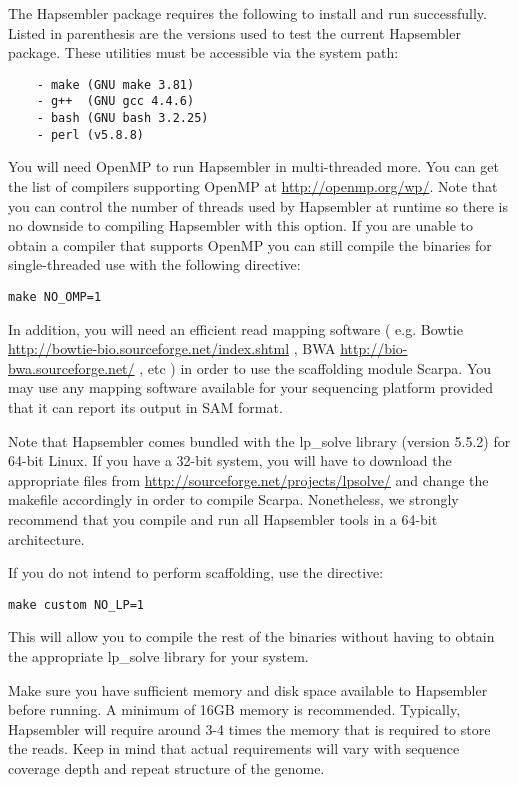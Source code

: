 \documentclass[12pt,a4paper]{report}
\begin{document}
The Hapsembler package requires the following to install and run successfully. Listed in parenthesis are the versions used to test the current Hapsembler package. These utilities must be accessible via the system path:

\begin{verbatim}
    - make (GNU make 3.81)
    - g++  (GNU gcc 4.4.6)
    - bash (GNU bash 3.2.25)
    - perl (v5.8.8)
\end{verbatim}

You will need OpenMP to run Hapsembler in multi-threaded more. You can get the list of compilers supporting OpenMP at \url{http://openmp.org/wp/}. Note that you can control the number of threads used by Hapsembler at runtime so there is no downside to compiling Hapsembler with this option. If you are unable to obtain a compiler that supports OpenMP you can still compile the binaries for single-threaded use with the following directive:

\begin{verbatim}
make NO_OMP=1
\end{verbatim}

In addition, you will need an efficient read mapping software ( e.g. Bowtie \url{http://bowtie-bio.sourceforge.net/index.shtml} , BWA
\url{http://bio-bwa.sourceforge.net/} , etc ) in order to use the scaffolding module Scarpa. You may use any mapping software available for your sequencing platform provided that it can report its output in SAM format.

Note that Hapsembler comes bundled with the lp\_solve library (version 5.5.2) for 64-bit Linux. If you have a 32-bit system, you will have to download the appropriate files from \url{http://sourceforge.net/projects/lpsolve/} and change the makefile accordingly in order to compile Scarpa. Nonetheless, we strongly recommend that you compile and run all Hapsembler tools in a 64-bit architecture. 

If you do not intend to perform scaffolding, use the directive:

\begin{verbatim}
make custom NO_LP=1
\end{verbatim}

This will allow you to compile the rest of the binaries without having to obtain the appropriate lp\_solve library for your system.

Make sure you have sufficient memory and disk space available to Hapsembler before running. A minimum of 16GB memory is recommended. Typically, Hapsembler will require around 3-4 times the memory that is required to store the reads. Keep in mind that actual requirements will vary with sequence coverage depth and repeat structure of the genome.
\end{document}
